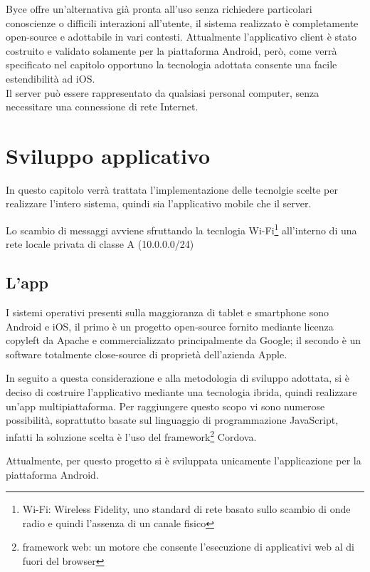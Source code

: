 \documentclass[target=bach]{thud}
\begin{document}
    Byce offre un'alternativa già pronta all'uso senza richiedere particolari conoscienze o difficili interazioni all'utente, il sistema realizzato è completamente open-source e adottabile in vari contesti.
    Attualmente l'applicativo client è stato costruito e validato solamente per la piattaforma Android, però, come verrà specificato nel capitolo opportuno la tecnologia adottata consente una facile estendibilità ad iOS.\\
    Il server può essere rappresentato da qualsiasi personal computer, senza necessitare una connessione di rete Internet.\\


\chapter{Sviluppo applicativo}
    In questo capitolo verrà trattata l'implementazione delle tecnolgie scelte per realizzare l'intero sistema, quindi sia l'applicativo mobile che il server.

    Lo scambio di messaggi avviene sfruttando la tecnlogia Wi-Fi\footnote[1]{Wi-Fi: Wireless Fidelity, uno standard di rete basato sullo scambio di onde radio e quindi l'assenza di un canale fisico} all'interno di una rete locale privata di classe A (10.0.0.0/24)

    \section{L'app}

        I sistemi operativi presenti sulla maggioranza di tablet e smartphone sono Android e iOS, il primo è un progetto open-source fornito mediante licenza copyleft da Apache e commercializzato principalmente da Google; il secondo è un software totalmente close-source di proprietà dell'azienda Apple.

        In seguito a questa considerazione e alla metodologia di sviluppo adottata, si è deciso di costruire l'applicativo mediante una tecnologia ibrida, quindi realizzare un'app multipiattaforma. Per raggiungere questo scopo vi sono numerose possibilità, soprattutto basate sul linguaggio di programmazione JavaScript, infatti la soluzione scelta è l'uso del framework\footnote[2]{framework web: un motore che consente l'esecuzione di applicativi web al di fuori del browser} Cordova.

        Attualmente, per questo progetto si è sviluppata unicamente l'applicazione per la piattaforma Android.
\end{document}
